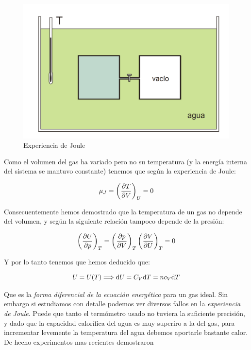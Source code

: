 \documentclass[12pt,a4paper]{article}
\begin{document}
\begin{figure}[h!] \centering
\includegraphics[scale=0.55]{experiencia-joule.png}
\caption{Experiencia de Joule}
\end{figure}

Como el volumen del gas ha variado pero no su temperatura (y la energía interna del sistema se mantuvo constante) tenemos que según la experiencia de Joule:

\begin{equation}
\mu_J = \left( \frac{\partial T}{\partial V} \right)_U = 0
\end{equation}

Consecuentemente hemos demostrado que la temperatura de un gas no depende del volumen, y según la siguiente relación tampoco depende de la presión:

\begin{equation}
\left( \frac{\partial U}{\partial p} \right)_T =  \left( \frac{\partial p}{\partial V} \right)_T \left( \frac{\partial V}{\partial U} \right)_T= 0
\end{equation}

Y por lo tanto tenemos que hemos deducido que:

\begin{equation}
U = U(T)  \Longrightarrow \mathrm{d} U = C_V \mathrm{d} T = n c_V \mathrm{d} T \label{ec:1.2-014} 
\end{equation}


Que es la \textit{forma diferencial de la ecuación energética} para un gas ideal. Sin embargo si estudiamos con detalle podemos ver diversos fallos en la \textit{experiencia de Joule}. Puede que tanto el termómetro usado no tuviera la suficiente precisión, y dado que la capacidad calorífica del agua es muy superiro a la del gas, para incrementar levemente la temperatura del agua debemos aportarle bastante calor. De hecho experimentos mas recientes demostraron 
\end{document}
